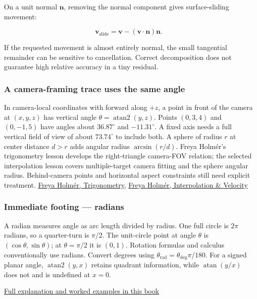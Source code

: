 On a unit normal \(\mathbf n\), removing the normal component gives surface-sliding movement:

\[
\mathbf v_{\mathrm{slide}}=\mathbf v-(\mathbf v\cdot\mathbf n)\mathbf n.
\]

If the requested movement is almost entirely normal, the small tangential remainder can be sensitive to cancellation. Correct decomposition does not guarantee high relative accuracy in a tiny residual.

\subsubsection{A camera-framing trace uses the same angle}\label{a-camera-framing-trace-uses-the-same-angle}

In camera-local coordinates with forward along \(+z\), a point in front of the camera at \((x,y,z)\) has vertical angle \(\theta=\operatorname{atan2}(y,z)\). Points \((0,3,4)\) and \((0,-1,5)\) have angles about \(36.87^\circ\) and \(-11.31^\circ\). A fixed axis needs a full vertical field of view of about \(73.74^\circ\) to include both. A sphere of radius \(r\) at center distance \(d>r\) adds angular radius \(\arcsin(r/d)\). Freya Holmér's trigonometry lesson develops the right-triangle camera-FOV relation; the selected interpolation lesson covers multiple-target camera fitting and the sphere angular radius. Behind-camera points and horizontal aspect constraints still need explicit treatment. \href{https://www.youtube.com/watch?v=1NLekEd770w}{Freya Holmér, Trigonometry}, \href{https://www.youtube.com/watch?v=-Ii3MrJFBkQ}{Freya Holmér, Interpolation \& Velocity}

\subsubsection{Immediate footing --- radians}\label{immediate-footing-radians}

A radian measures angle as arc length divided by radius. One full circle is \(2\pi\) radians, so a quarter-turn is \(\pi/2\). The unit-circle point at angle \(\theta\) is \((\cos\theta,\sin\theta)\); at \(\theta=\pi/2\) it is \((0,1)\). Rotation formulas and calculus conventionally use radians. Convert degrees using \(\theta_{\mathrm{rad}}=\theta_{\mathrm{deg}}\pi/180\). For a signed planar angle, \(\operatorname{atan2}(y,x)\) retains quadrant information, while \(\operatorname{atan}(y/x)\) does not and is undefined at \(x=0\).

\hyperref[01-foundations-i-ch017]{Full explanation and worked examples in this book}

